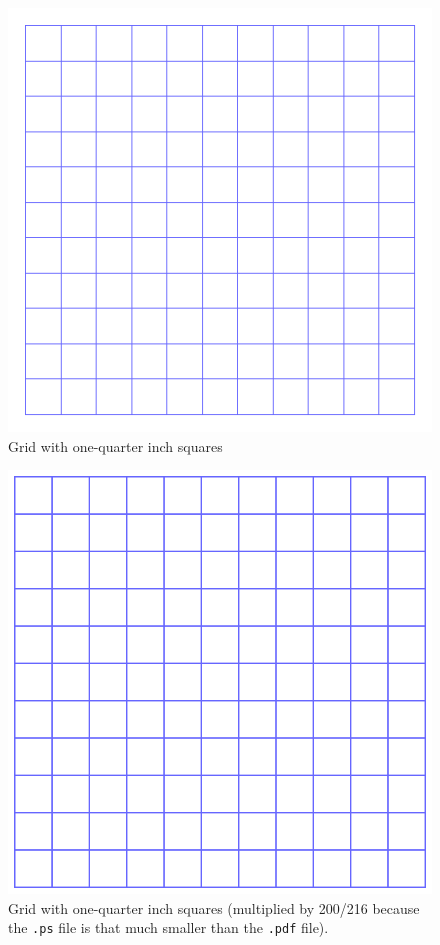 \documentclass{article}
\begin{document}
\begin{figure}
\includegraphics{fig_testd.pdf}
\caption{Grid with one-quarter inch squares}
\end{figure}

\begin{figure}
\includegraphics{fig_testd.ps}
\caption{Grid with one-quarter inch squares (multiplied by 200/216
because the \texttt{.ps} file is that much smaller than the \texttt{.pdf}
file).}
\end{figure}
\end{document}
